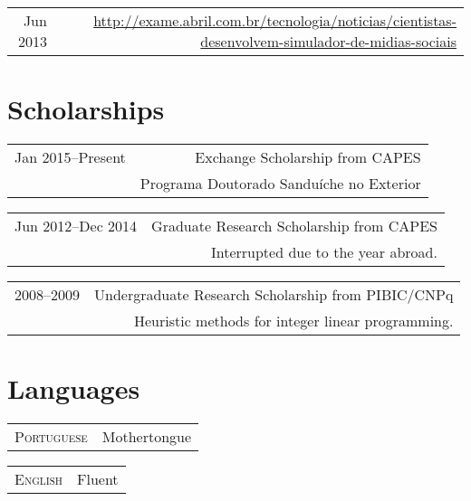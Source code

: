 \documentclass[a4paper,10pt]{article}
\begin{document}
\begin{tabularx}{\textwidth}{D|R}
Jun 2013        & \footnotesize \url{http://exame.abril.com.br/tecnologia/noticias/cientistas-desenvolvem-simulador-de-midias-sociais}\\
\end{tabularx}


\section{Scholarships}

\begin{tabularx}{\textwidth}{D|R}
Jan 2015--Present   & Exchange Scholarship from CAPES\\
                    & \footnotesize Programa Doutorado Sandu\'iche no Exterior
\end{tabularx}

\begin{tabularx}{\textwidth}{D|R}
Jun 2012--Dec 2014  & Graduate Research Scholarship from CAPES\\
                    & \footnotesize Interrupted due to the year abroad.\\
\end{tabularx}

\begin{tabularx}{\textwidth}{D|R}
2008--2009   & Undergraduate Research Scholarship from PIBIC/CNPq\\
            & \footnotesize Heuristic methods for integer linear programming.\\
\end{tabularx}


\section{Languages}

\begin{tabularx}{\textwidth}{D|R}
\textsc{Portuguese} & Mothertongue\\
\end{tabularx}

\begin{tabularx}{\textwidth}{D|R}
\textsc{English}    & Fluent\\
\end{tabularx}
\end{document}
